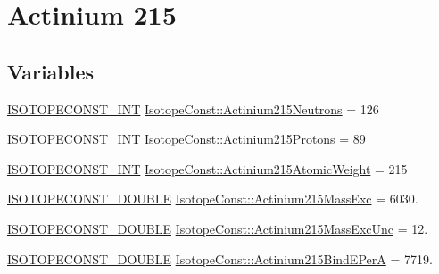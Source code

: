 \hypertarget{group___isotope_const-_actinium-_ac215}{}\section{Actinium 215}
\label{group___isotope_const-_actinium-_ac215}
\subsection*{Variables}
\begin{DoxyCompactItemize}
\item 
\mbox{\hyperlink{group___isotope_const-_macros_ga5f18360b3e99483a35c32d789e62621c}{I\+S\+O\+T\+O\+P\+E\+C\+O\+N\+S\+T\+\_\+\+I\+NT}} \mbox{\hyperlink{group___isotope_const-_actinium-_ac215_gadeaa823922aae5990586e51df810f005}{Isotope\+Const\+::\+Actinium215\+Neutrons}} = 126
\item 
\mbox{\hyperlink{group___isotope_const-_macros_ga5f18360b3e99483a35c32d789e62621c}{I\+S\+O\+T\+O\+P\+E\+C\+O\+N\+S\+T\+\_\+\+I\+NT}} \mbox{\hyperlink{group___isotope_const-_actinium-_ac215_ga49849cebbe0cb1c2a1adb8afba600ee3}{Isotope\+Const\+::\+Actinium215\+Protons}} = 89
\item 
\mbox{\hyperlink{group___isotope_const-_macros_ga5f18360b3e99483a35c32d789e62621c}{I\+S\+O\+T\+O\+P\+E\+C\+O\+N\+S\+T\+\_\+\+I\+NT}} \mbox{\hyperlink{group___isotope_const-_actinium-_ac215_ga7df68aa152b737b4ed93b3a15ae4425d}{Isotope\+Const\+::\+Actinium215\+Atomic\+Weight}} = 215
\item 
\mbox{\hyperlink{group___isotope_const-_macros_ga8f45a7272ce02c0b4c65c44636ed719a}{I\+S\+O\+T\+O\+P\+E\+C\+O\+N\+S\+T\+\_\+\+D\+O\+U\+B\+LE}} \mbox{\hyperlink{group___isotope_const-_actinium-_ac215_ga675affb1d400e0ee84580d9c798cdac9}{Isotope\+Const\+::\+Actinium215\+Mass\+Exc}} = 6030.
\item 
\mbox{\hyperlink{group___isotope_const-_macros_ga8f45a7272ce02c0b4c65c44636ed719a}{I\+S\+O\+T\+O\+P\+E\+C\+O\+N\+S\+T\+\_\+\+D\+O\+U\+B\+LE}} \mbox{\hyperlink{group___isotope_const-_actinium-_ac215_gaf91a8b724154fd7de5e35f7fd0dae921}{Isotope\+Const\+::\+Actinium215\+Mass\+Exc\+Unc}} = 12.
\item 
\mbox{\hyperlink{group___isotope_const-_macros_ga8f45a7272ce02c0b4c65c44636ed719a}{I\+S\+O\+T\+O\+P\+E\+C\+O\+N\+S\+T\+\_\+\+D\+O\+U\+B\+LE}} \mbox{\hyperlink{group___isotope_const-_actinium-_ac215_ga4dfa851c7c1f30c5f737c25dfade4a1e}{Isotope\+Const\+::\+Actinium215\+Bind\+E\+PerA}} = 7719.
\item 

\end{DoxyCompactItemize}
